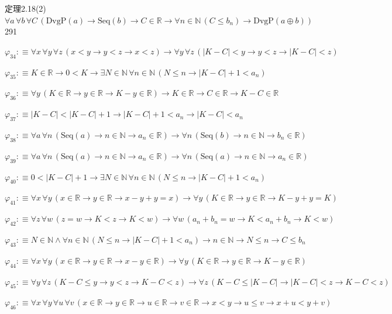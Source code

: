 \begin{fullproof}{定理2.18(2)}{$\forall a\,\forall b\,\forall C\,(\mathrm{DvgP}(a) \to \mathrm{Seq}(b) \to C \in \mathbb{R} \to \forall n \in \mathbb{N}\,(C \leq b_{n}) \to \mathrm{DvgP}(a \oplus b))$}{291}
\begin{abbrevlist}
\item $\varphi_{34} :\equiv \forall x\,\forall y\,\forall z\,(x < y \to y < z \to x < z) \to \forall y\,\forall z\,(\lvert K - C \rvert < y \to y < z \to \lvert K - C \rvert < z)$
\item $\varphi_{35} :\equiv K \in \mathbb{R} \to 0 < K \to \exists N \in \mathbb{N}\,\forall n \in \mathbb{N}\,(N \leq n \to \lvert K - C \rvert + 1 < a_{n})$
\item $\varphi_{36} :\equiv \forall y\,(K \in \mathbb{R} \to y \in \mathbb{R} \to K - y \in \mathbb{R}) \to K \in \mathbb{R} \to C \in \mathbb{R} \to K - C \in \mathbb{R}$
\item $\varphi_{37} :\equiv \lvert K - C \rvert < \lvert K - C \rvert + 1 \to \lvert K - C \rvert + 1 < a_{n} \to \lvert K - C \rvert < a_{n}$
\item $\varphi_{38} :\equiv \forall a\,\forall n\,(\mathrm{Seq}(a) \to n \in \mathbb{N} \to a_{n} \in \mathbb{R}) \to \forall n\,(\mathrm{Seq}(b) \to n \in \mathbb{N} \to b_{n} \in \mathbb{R})$
\item $\varphi_{39} :\equiv \forall a\,\forall n\,(\mathrm{Seq}(a) \to n \in \mathbb{N} \to a_{n} \in \mathbb{R}) \to \forall n\,(\mathrm{Seq}(a) \to n \in \mathbb{N} \to a_{n} \in \mathbb{R})$
\item $\varphi_{40} :\equiv 0 < \lvert K - C \rvert + 1 \to \exists N \in \mathbb{N}\,\forall n \in \mathbb{N}\,(N \leq n \to \lvert K - C \rvert + 1 < a_{n})$
\item $\varphi_{41} :\equiv \forall x\,\forall y\,(x \in \mathbb{R} \to y \in \mathbb{R} \to x - y + y = x) \to \forall y\,(K \in \mathbb{R} \to y \in \mathbb{R} \to K - y + y = K)$
\item $\varphi_{42} :\equiv \forall z\,\forall w\,(z = w \to K < z \to K < w) \to \forall w\,(a_{n} + b_{n} = w \to K < a_{n} + b_{n} \to K < w)$
\item $\varphi_{43} :\equiv N \in \mathbb{N} \land \forall n \in \mathbb{N}\,(N \leq n \to \lvert K - C \rvert + 1 < a_{n}) \to n \in \mathbb{N} \to N \leq n \to C \leq b_{n}$
\item $\varphi_{44} :\equiv \forall x\,\forall y\,(x \in \mathbb{R} \to y \in \mathbb{R} \to x - y \in \mathbb{R}) \to \forall y\,(K \in \mathbb{R} \to y \in \mathbb{R} \to K - y \in \mathbb{R})$
\item $\varphi_{45} :\equiv \forall y\,\forall z\,(K - C \leq y \to y < z \to K - C < z) \to \forall z\,(K - C \leq \lvert K - C \rvert \to \lvert K - C \rvert < z \to K - C < z)$
\item $\varphi_{46} :\equiv \forall x\,\forall y\,\forall u\,\forall v\,(x \in \mathbb{R} \to y \in \mathbb{R} \to u \in \mathbb{R} \to v \in \mathbb{R} \to x < y \to u \leq v \to x + u < y + v)$

\end{abbrevlist}
\end{fullproof}
